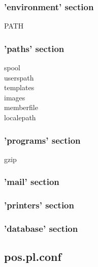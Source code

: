 \documentclass[10pt,A4]{book}
\begin{document}
\subsubsection{'environment' section}

\begin{description}
\item[PATH]
\end{description}


\subsubsection{'paths' section}

\begin{description}
\item [spool]
\item [userspath]
\item [templates]
\item [images]
\item [memberfile]
\item [localepath]
\end{description}

\subsubsection{'programs' section}

\begin{description}
\item [gzip]
\end{description}


\subsubsection{'mail' section}

\subsubsection{'printers' section}

\subsubsection{'database' section}



\subsection{pos.pl.conf}
\end{document}
